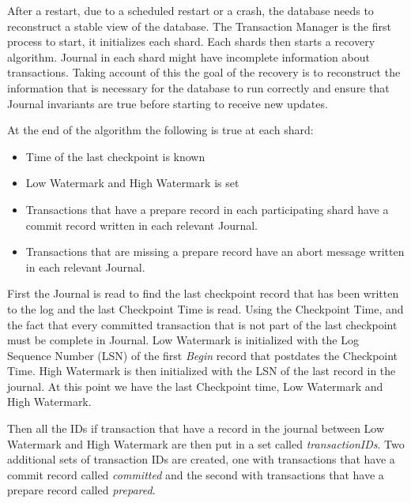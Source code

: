 \documentclass[twoside]{article}
\begin{document}
After a restart, due to a scheduled restart or a crash, the database needs to 
reconstruct a stable view of the database. 
The Transaction Manager is the first process to start, it initializes each shard.
Each shards then starts a recovery algorithm.
Journal in each shard might have incomplete information 
about transactions. 
Taking account of this the goal of the recovery is to reconstruct the information
that is necessary for the database to run correctly and ensure that Journal invariants
are true before starting to receive new updates.


At the end of the algorithm the following is true at each shard:
\begin{itemize}
  \item Time of the last checkpoint is known
  \item Low Watermark and High Watermark is set
  \item Transactions that have a prepare record in each participating shard have a 
  commit record written in each relevant Journal.
  \item Transactions that are missing a prepare record have an abort message 
  written in each relevant Journal.
\end{itemize}

First the Journal is read to find the last checkpoint record that has been written
to the log and the last Checkpoint Time is read. 
Using the Checkpoint Time, and the fact that every committed transaction that is not part
of the last checkpoint must be complete in Journal.
Low Watermark is initialized with the Log Sequence Number (LSN) of the first \textit{Begin} 
record that postdates the Checkpoint Time. 
High Watermark is then initialized with the LSN of the last record in the journal.
At this point we have the last Checkpoint time, Low Watermark and High Watermark.

Then all the IDs if transaction that have a record in the journal between Low Watermark
and High Watermark are then put in a set called \textit{transactionIDs}.
Two additional sets of transaction IDs are created, one with transactions that have
a commit record called \textit{committed} and the second with transactions that have
a prepare record called \textit{prepared}.
\end{document}
